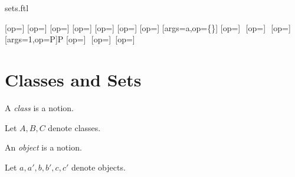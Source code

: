 \documentclass{naproche-library}
\begin{document}
\begin{smodule}{sets.ftl}


\STEXexport{
  \let\oldsubseteq\subseteq
  \let\subseteq\relax
  \let\oldsubset\subset
  \let\subset\relax
  \let\oldsupseteq\supseteq
  \let\supseteq\relax
  \let\oldsupset\supset
  \let\supset\relax
  \let\oldsubsetneq\subsetneq
  \let\subsetneq\relax
  \let\oldsupsetneq\supsetneq
  \let\supsetneq\relax
  \let\oldemptyset\emptyset
  \let\emptyset\relax
  \let\oldcup\cup
  \let\cup\relax
  \let\oldcap\cap
  \let\cap\relax
  \let\oldsetminus\setminus
  \let\setminus\relax
  \let\oldtimes\times
  \let\times\relax
  \let\oldbigcup\bigcup
  \let\bigcup\relax
  \let\oldbigcap\bigcap
  \let\bigcap\relax
}
[op=\oldsubseteq]{\;\oldsubseteq\;}
[op=\oldsubset]{\;\oldsubset\;}
[op=\oldsupseteq]{\;\oldsupseteq\;}
[op=\oldsupset]{\;\oldsupset\;}
[op=\oldsubsetneq]{\;\oldsubsetneq\;}
[op=\oldsupsetneq]{\;\oldsupsetneq\;}
[op=\oldemptyset]{\oldemptyset}
[args=a,op=\{\cdot\}]{\comp{\{}\comp{\}}}
[op=\oldcup]{\,\oldcup\,}
[op=\oldcap]{\,\oldcap\,}
[op=\oldsetminus]{\,\oldsetminus\,}
[args=1,op=\mathcal P]{\mathcal P}
[op=\oldtimes]{\,\oldtimes\,}
[op=\oldbigcup]{\oldbigcup\,}
[op=\oldbigcap]{\oldbigcap\,}

\section{Classes and Sets}

\begin{signature*}
  A \emph{class} is a notion.
\end{signature*}

\begin{forthel}
  Let $A,B,C$ denote classes.
\end{forthel}

\begin{signature*}
  An \emph{object} is a notion.
\end{signature*}

\begin{forthel}
  Let $a,a',b,b',c,c'$ denote objects.
\end{forthel}


\end{smodule}
\end{document}
